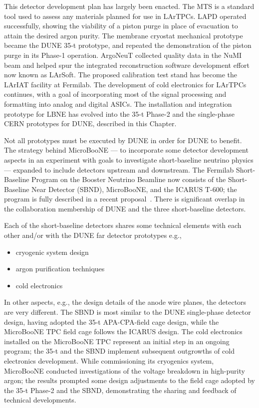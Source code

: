 This detector development plan has largely been enacted.  The MTS is a standard tool used to assess any materials planned for use in LArTPCs.  LAPD operated successfully, showing the viability of a piston purge in place of evacuation to attain the desired argon purity.  The membrane cryostat mechanical prototype became the DUNE 35-t prototype, and repeated the demonstration of the piston purge in its Phase-1 operation.  ArgoNeuT collected quality data in the NuMI beam and helped spur the integrated reconstruction software development effort now known as LArSoft.  The proposed calibration test stand has become the LArIAT facility at Fermilab.  The development of cold electronics for LArTPCs continues, with a goal of incorporating most of the signal processing and formatting into analog and digital ASICs.  The installation and integration prototype for LBNE has evolved into the 35-t Phase-2 and the single-phase CERN prototypes for DUNE, described in this Chapter.
 
Not all prototypes must be executed by DUNE in order for DUNE to benefit.  The strategy behind MicroBooNE --- to incorporate some detector development aspects in an experiment with goals to investigate short-baseline neutrino physics --- expanded to include detectors upstream and downstream.  The Fermilab Short-Baseline Program on the Booster Neutrino Beamline now consists of the Short-Baseline Near Detector (SBND), MicroBooNE, and the ICARUS T-600; the program is fully described in a recent proposal~\cite{SBN}.  There is significant overlap in the collaboration membership of DUNE and the three short-baseline detectors.
 
Each of the short-baseline detectors shares some technical elements with each other and/or with the DUNE far detector prototypes e.g.,   
\begin{itemize}
\item cryogenic system design
\item argon purification techniques
\item cold electronics
\end{itemize}
In other aspects, e.g., the design details of the anode wire planes, %
the detectors are very different.  The SBND is most similar to the DUNE single-phase detector design, having adopted the 35-t APA-CPA-field cage design, while the MicroBooNE TPC field cage follows the ICARUS design.  The cold electronics installed on the MicroBooNE TPC represent an initial step in an ongoing program; the 35-t and the SBND 
implement subsequent outgrowths of
cold electronics development.  While commissioning its cryogenics system, MicroBooNE conducted investigations of the voltage breakdown in high-purity argon; the results prompted some design adjustments to the field cage adopted by the 35-t Phase-2 and the SBND, demonstrating the sharing and feedback of technical developments.  

